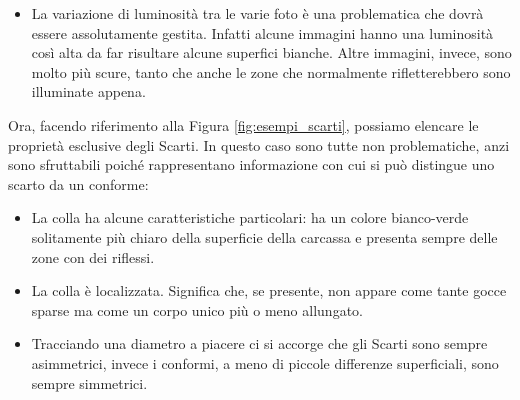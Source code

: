 \begin{itemize}

  \item La variazione di luminosità tra le varie foto è una problematica che dovrà essere assolutamente gestita.
    Infatti alcune immagini hanno una luminosità così alta da far risultare alcune superfici bianche.
    Altre immagini, invece, sono molto più scure, tanto che anche le zone che normalmente rifletterebbero sono illuminate appena.

\end{itemize}

Ora, facendo riferimento alla Figura \ref{fig:esempi_scarti}, possiamo elencare le proprietà esclusive degli Scarti.
In questo caso sono tutte non problematiche, anzi sono sfruttabili poiché rappresentano informazione con cui si può distingue uno scarto da un conforme:
\begin{itemize}
  \item La colla ha alcune caratteristiche particolari: ha un colore bianco-verde solitamente più chiaro della superficie della carcassa e presenta sempre delle zone con dei riflessi.

  \item La colla è localizzata.
    Significa che, se presente, non appare come tante gocce sparse ma come un corpo unico più o meno allungato.

  \item Tracciando una diametro a piacere ci si accorge che gli Scarti sono sempre asimmetrici, invece i conformi, a meno di piccole differenze superficiali, sono sempre simmetrici. %

\end{itemize}



